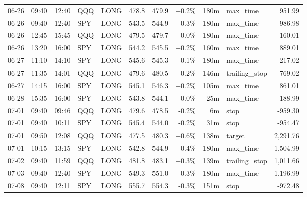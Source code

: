 \documentclass[11pt,a4paper,twoside]{article}
\begin{document}
\begin{center}
\begin{longtable}{>{\color{txtmain}}l l l l l r r r r >{\color{txtmain}}l r}
06-26 & 09:40 & 12:40 & QQQ & LONG & 478.8 & 479.9 & \textcolor{wingreen}{+0.2\%} & 180m & max\_time & \textcolor{wingreen}{951.99} \\
06-26 & 09:40 & 12:40 & SPY & LONG & 543.5 & 544.9 & \textcolor{wingreen}{+0.3\%} & 180m & max\_time & \textcolor{wingreen}{986.98} \\
06-26 & 12:45 & 15:45 & QQQ & LONG & 479.5 & 479.7 & \textcolor{wingreen}{+0.0\%} & 180m & max\_time & \textcolor{wingreen}{160.01} \\
06-26 & 13:20 & 16:00 & SPY & LONG & 544.2 & 545.5 & \textcolor{wingreen}{+0.2\%} & 160m & max\_time & \textcolor{wingreen}{889.01} \\
06-27 & 11:10 & 14:10 & SPY & LONG & 545.6 & 545.3 & \textcolor{lossred}{-0.1\%} & 180m & max\_time & \textcolor{lossred}{-217.02} \\
06-27 & 11:35 & 14:01 & QQQ & LONG & 479.6 & 480.5 & \textcolor{wingreen}{+0.2\%} & 146m & trailing\_stop & \textcolor{wingreen}{769.02} \\
06-27 & 14:15 & 16:00 & SPY & LONG & 545.1 & 546.3 & \textcolor{wingreen}{+0.2\%} & 105m & max\_time & \textcolor{wingreen}{861.01} \\
06-28 & 15:35 & 16:00 & SPY & LONG & 543.8 & 544.1 & \textcolor{wingreen}{+0.0\%} & 25m & max\_time & \textcolor{wingreen}{188.99} \\
07-01 & 09:40 & 09:46 & QQQ & LONG & 479.6 & 478.5 & \textcolor{lossred}{-0.2\%} & 6m & stop & \textcolor{lossred}{-959.30} \\
07-01 & 09:40 & 10:11 & SPY & LONG & 545.4 & 544.0 & \textcolor{lossred}{-0.2\%} & 31m & stop & \textcolor{lossred}{-954.47} \\
07-01 & 09:50 & 12:08 & QQQ & LONG & 477.5 & 480.3 & \textcolor{wingreen}{+0.6\%} & 138m & target & \textcolor{wingreen}{2,291.76} \\
07-01 & 10:15 & 13:15 & SPY & LONG & 542.8 & 544.9 & \textcolor{wingreen}{+0.4\%} & 180m & max\_time & \textcolor{wingreen}{1,504.99} \\
07-02 & 09:40 & 11:59 & QQQ & LONG & 481.8 & 483.1 & \textcolor{wingreen}{+0.3\%} & 139m & trailing\_stop & \textcolor{wingreen}{1,011.66} \\
07-03 & 09:40 & 12:40 & SPY & LONG & 549.3 & 551.0 & \textcolor{wingreen}{+0.3\%} & 180m & max\_time & \textcolor{wingreen}{1,196.99} \\
07-08 & 09:40 & 12:11 & SPY & LONG & 555.7 & 554.3 & \textcolor{lossred}{-0.3\%} & 151m & stop & \textcolor{lossred}{-972.48} \\

\end{longtable}
\end{center}
\end{document}
